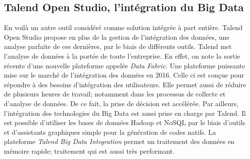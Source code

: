 \documentclass[12pt,a4wide,twoside]{report}
\begin{document}
	\subsection{Talend Open Studio, l'intégration du Big Data}
En voilà un autre outil considéré comme solution intégrée à part entière. Talend Open Studio propose en plus de la gestion de l'intégration des données, une analyse parfaite de ces dernières, par le biais de différents outils.\newline
Talend met l’analyse de données à la portée de toute l’entreprise. En effet, on note la sortie récente d'une nouvelle plateforme appelée \emph{Data Fabric}. Une plateforme puissante mise sur le marché de l'intégration des données en 2016.
Celle ci est conçue pour répondre à des besoins d'intégration des utilisateurs.
Elle permet aussi de réduire de plusieurs heures de travail; notamment dans les processus de collecte et d’analyse de données. De ce fait, la prise de décision est accélérée. \newline 
Par ailleurs, l'intégration des technologies du Big Data est aussi prise en charge par Talend. Il est possible d'utiliser les bases de données Hadoop et NoSQL par le biais d'outils et d'assistants graphiques simple pour la génération de codes natifs.\newline
La plateforme \emph{Talend Big Data Integration} permet un traitement des données en mémoire rapide; traitement qui est aussi très performant.
\end{document}
